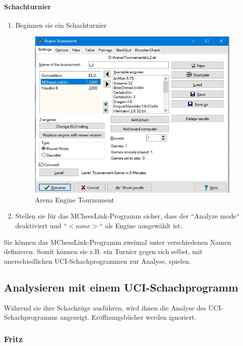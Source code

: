 \documentclass[11pt,a4paper]{article}
\begin{document}
\paragraph{Schachturnier}
\begin{enumerate}
\item Beginnen sie ein Schachturnier
  \begin{figure}[H]
	\centering
	\includegraphics[scale=0.7]{arena_enginetournament.jpg}
	\caption{Arena Engine Tournament}
	\label{fig:ArenaEngineTournament}
\end{figure}
\item Stellen sie für das MChessLink-Programm sicher, dass der ``Analyze mode`` deaktiviert und ``\begin{math} <none> \end{math}`` als Engine ausgewählt ist.
\end{enumerate}
Sie können das MChessLink-Programm zweimal unter verschiedenen Namen definieren. Somit können sie z.B. ein Turnier gegen sich selbst, mit unerschiedlichen UCI-Schachprogrammen zur Analyse, spielen.

\subsection{Analysieren mit einem UCI-Schachprogramm}
Während sie ihre Schachzüge ausführen, wird ihnen die Analyse des UCI-Schachprogramms angezeigt. Eröffnungsbücher werden ignoriert.
\subsubsection{Fritz}
\end{document}
